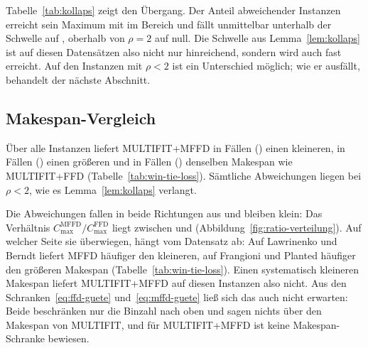 Tabelle~\ref{tab:kollaps} zeigt den Übergang.
Der Anteil abweichender Instanzen erreicht sein Maximum mit \EvalKollapsMaxAnteil{} im Bereich
\EvalKollapsMaxBereich{} und fällt unmittelbar unterhalb der Schwelle auf
\EvalKollapsLetzterAnteil, oberhalb von $\rho = 2$ auf null.
Die Schwelle aus Lemma~\ref{lem:kollaps} ist auf diesen Datensätzen also nicht nur hinreichend,
sondern wird auch fast erreicht.
Auf den \EvalRhoUnterZwei{} Instanzen mit $\rho < 2$ ist ein Unterschied möglich; wie er
ausfällt, behandelt der nächste Abschnitt.

\begin{table}[htbp]
\centering

\caption{Anteil der Instanzen, auf denen MULTIFIT+MFFD und MULTIFIT+FFD verschiedene Makespans
  liefern, gestaffelt nach $\rho$. Oberhalb von $\rho = 2$ tritt keine Abweichung auf
  (Lemma~\ref{lem:kollaps}).}
\label{tab:kollaps}
\end{table}

\subsection{Makespan-Vergleich}
\label{sec:makespan-vergleich}

Über alle \EvalInstanzen{} Instanzen liefert MULTIFIT+MFFD in \EvalWins{} Fällen
(\EvalWinsProzent) einen kleineren, in \EvalLosses{} Fällen (\EvalLossesProzent) einen größeren
und in \EvalTies{} Fällen (\EvalTiesProzent) denselben Makespan wie MULTIFIT+FFD
(Tabelle~\ref{tab:win-tie-loss}).
Sämtliche \EvalAbweichungen{} Abweichungen liegen bei $\rho < 2$, wie es
Lemma~\ref{lem:kollaps} verlangt.

\begin{table}[htbp]
\centering
\small

\caption{Vergleich der Makespans von MULTIFIT+MFFD und MULTIFIT+FFD je Datensatz. Die Zeile
  \emph{Alle} berechnet Anzahlen und Kennzahlen über alle Instanzen gemeinsam.}
\label{tab:win-tie-loss}
\end{table}

Die Abweichungen fallen in beide Richtungen aus und bleiben klein:
Das Verhältnis $C^{\mathrm{MFFD}}_{\max}/C^{\mathrm{FFD}}_{\max}$ liegt zwischen \EvalMinRatioMffdFfd{} und
\EvalMaxRatioMffdFfd{} (Abbildung~\ref{fig:ratio-verteilung}).
Auf welcher Seite sie überwiegen, hängt vom Datensatz ab: Auf Lawrinenko und Berndt liefert
MFFD häufiger den kleineren, auf Frangioni und Planted häufiger den größeren Makespan
(Tabelle~\ref{tab:win-tie-loss}).
Einen systematisch kleineren Makespan liefert MULTIFIT+MFFD auf diesen Instanzen also nicht.
Aus den Schranken~\eqref{eq:ffd-guete} und~\eqref{eq:mffd-guete} ließ sich das auch nicht
erwarten: Beide beschränken nur die Binzahl nach oben und sagen nichts über den Makespan von
MULTIFIT, und für MULTIFIT+MFFD ist keine Makespan-Schranke bewiesen.

